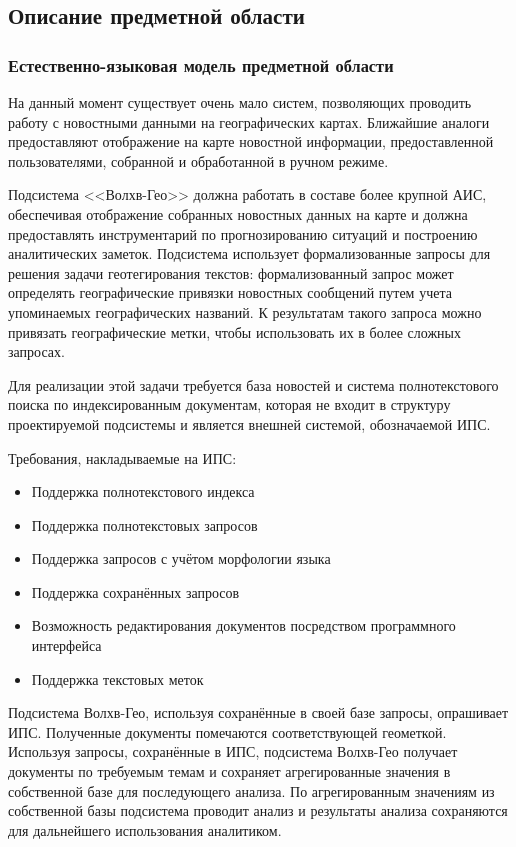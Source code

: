 \clearpage
\subsection{Описание предметной области}
\subsubsection{Естественно-языковая модель предметной области}

На данный момент существует очень мало систем, позволяющих проводить работу с новостными данными на географических картах. Ближайшие аналоги предоставляют отображение на карте новостной информации, предоставленной пользователями, собранной и обработанной в ручном режиме.

Подсистема <<Волхв-Гео>> должна работать в составе более крупной АИС, обеспечивая отображение собранных новостных данных на карте и должна предоставлять инструментарий по прогнозированию ситуаций и построению аналитических заметок. Подсистема использует формализованные запросы для решения задачи геотегирования текстов: формализованный запрос может определять географические привязки новостных сообщений путем учета упоминаемых географических названий. К результатам такого запроса можно привязать географические метки, чтобы использовать их в более сложных запросах.

Для реализации этой задачи требуется база новостей и система полнотекстового поиска по индексированным документам, которая не входит в структуру проектируемой подсистемы и является внешней системой, обозначаемой ИПС.

Требования, накладываемые на ИПС:
\begin{itemize}
\item Поддержка полнотекстового индекса
\item Поддержка полнотекстовых запросов
\item Поддержка запросов с учётом морфологии языка
\item Поддержка сохранённых запросов
\item Возможность редактирования документов посредством программного интерфейса
\item Поддержка текстовых меток
\end{itemize}

Подсистема Волхв-Гео, используя сохранённые в своей базе запросы, опрашивает ИПС. Полученные документы помечаются соответствующей геометкой. Используя запросы, сохранённые в ИПС, подсистема Волхв-Гео получает документы по требуемым темам и сохраняет агрегированные значения в собственной базе для последующего анализа.
По агрегированным значениям из собственной базы подсистема проводит анализ и результаты анализа сохраняются для дальнейшего использования аналитиком.

